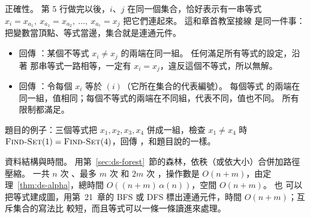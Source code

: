 正確性。 第 5 行做完以後，$i$、$j$ 在同一個集合，恰好表示有一串等式
$x_i = x_{a_1},\ x_{a_1} = x_{a_2},\ \ldots,\ x_{a_r} = x_j$ 把它們連起來。 這和章首教室接線
是同一件事：把變數當頂點、等式當邊，集合就是連通元件。
\begin{itemize}
\item 回傳 \FALSE：某個不等式 $x_i \ne x_j$ 的兩端在同一組。 任何滿足所有等式的設定，沿著
那串等式一路相等，一定有 $x_i = x_j$，違反這個不等式，所以無解。
\item 回傳 \TRUE：令每個 $x_i$ 等於 $(i)$（它所在集合的代表編號）。 每個等式
的兩端在同一組，值相同；每個不等式的兩端在不同組，代表不同，值也不同。 所有限制都滿足。
\end{itemize}
題目的例子：三個等式把 $x_1, x_2, x_3, x_4$ 併成一組，檢查 $x_1 \ne x_4$ 時
$\proc{Find-Set}(1) = \proc{Find-Set}(4)$，回傳 \FALSE，和題目說的一樣。

資料結構與時間。 用第~\ref{sec:ds-forest}~節的森林，依秩（或依大小）合併加路徑壓縮。 一共
$n$ 次 、最多 $m$ 次  和 $2m$ 次 ，操作數是
$O(n + m)$，由定理~\ref{thm:ds-alpha}，總時間 $O((n + m)\,\alpha(n))$，空間 $O(n + m)$。 也
可以把等式建成圖，用第~21~章的 BFS 或 DFS 標出連通元件，時間 $O(n + m)$；互斥集合的寫法比
較短，而且等式可以一條一條讀進來處理。
